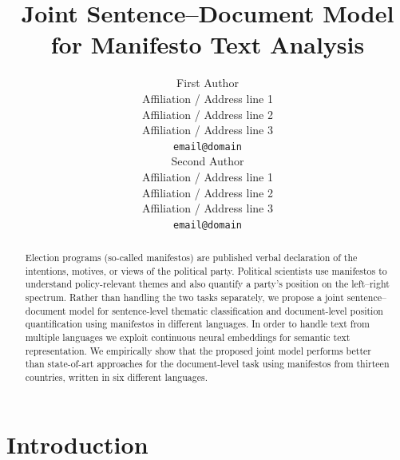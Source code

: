\documentclass[11pt,a4paper]{article}
\title{Joint Sentence--Document Model for Manifesto Text Analysis}
\author{First Author \\
  Affiliation / Address line 1 \\
  Affiliation / Address line 2 \\
  Affiliation / Address line 3 \\
  {\tt email@domain} \\\And
  Second Author \\
  Affiliation / Address line 1 \\
  Affiliation / Address line 2 \\
  Affiliation / Address line 3 \\
  {\tt email@domain} \\}
\date{}
\begin{document}
\maketitle


\begin{abstract}
Election programs (so-called manifestos) are published verbal declaration of the intentions, motives, or views of the political party. Political scientists use manifestos to understand policy-relevant themes  and also quantify a party's position on the left--right spectrum. Rather than handling the two tasks separately, we propose a joint sentence--document model for sentence-level thematic classification and document-level position quantification using manifestos in different languages. In order to handle text from multiple languages we exploit continuous neural embeddings for semantic text representation. We empirically show that the proposed joint model performs better than state-of-art approaches for the document-level task using manifestos from thirteen countries, written in six different languages.
\end{abstract}

\section{Introduction}

\end{document}
